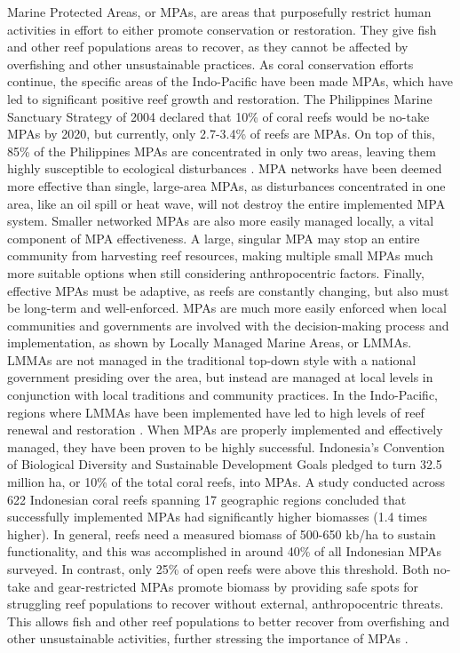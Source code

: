 \documentclass{book}\usepackage{knitr}
\begin{document}
\begin{knitrout}
\begin{kframe}
{Marine Protected Areas, or MPAs, are areas that purposefully restrict human activities in effort to either promote conservation or restoration. They give fish and other reef populations areas to recover, as they cannot be affected by overfishing and other unsustainable practices. As coral conservation efforts continue, the specific areas of the Indo-Pacific have been made MPAs, which have led to significant positive reef growth and restoration. The Philippines Marine Sanctuary Strategy of 2004 declared that 10\% of coral reefs would be no-take MPAs by 2020, but currently, only 2.7-3.4\% of reefs are MPAs. On top of this, 85\% of the Philippines MPAs are concentrated in only two areas, leaving them highly susceptible to ecological disturbances \citep{10.2307/40603378}. MPA networks have been deemed more effective than single, large-area MPAs, as disturbances concentrated in one area, like an oil spill or heat wave, will not destroy the entire implemented MPA system. Smaller networked MPAs are also more easily managed locally, a vital component of MPA effectiveness. A large, singular MPA may stop an entire community from harvesting reef resources, making multiple small MPAs much more suitable options when still considering anthropocentric factors\citep{Keller2009ClimateCC}. Finally, effective MPAs must be adaptive, as reefs are constantly changing, but also must be long-term and well-enforced. MPAs are much more easily enforced when local communities and governments are involved with the decision-making process and implementation, as shown by Locally Managed Marine Areas, or LMMAs. LMMAs are not managed in the traditional top-down style with a national government presiding over the area, but instead are managed at local levels in conjunction with local traditions and community practices. In the Indo-Pacific, regions where LMMAs have been implemented have led to high levels of reef renewal and restoration \citep{cgarden}. 
When MPAs are properly implemented and effectively managed, they have been proven to be highly successful. Indonesia’s Convention of Biological Diversity and Sustainable Development Goals pledged to turn 32.5 million ha, or 10\% of the total coral reefs, into MPAs. A study conducted across 622 Indonesian coral reefs spanning 17 geographic regions concluded that successfully implemented MPAs had significantly higher biomasses (1.4 times higher). In general, reefs need a measured biomass of 500-650 kb/ha to sustain functionality, and this was accomplished in around 40\% of all Indonesian MPAs surveyed. In contrast, only 25\% of open reefs were above this threshold. Both no-take and gear-restricted MPAs promote biomass by providing safe spots for struggling reef populations to recover without external, anthropocentric threats. This allows fish and other reef populations to better recover from overfishing and other unsustainable activities, further stressing the importance of MPAs \citep{https://doi.org/10.1111/conl.12698}. 

}
\end{kframe}
\end{knitrout}
\end{document}
